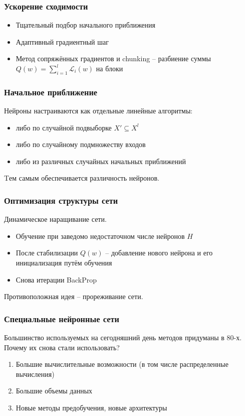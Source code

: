 \documentclass[10pt]{beamer}
\begin{document}
\begin{frame}\frametitle{Ускорение сходимости}
	\begin{itemize}[<+->]
		\item Тщательный подбор начального приближения
		\item Адаптивный градиентный шаг
		\item Метод сопряжённых градиентов и chunking -- разбиение суммы $Q(w) = \sum\limits_{i=1}^l \mathcal{L}_i(w)$ на блоки
	\end{itemize}
\end{frame}

\begin{frame}\frametitle{Начальное приближение}
	Нейроны настраиваются как отдельные линейные алгоритмы:
	\begin{itemize}
		\item либо по случайной подвыборке $X' \subseteq X^l$
		\item либо по случайному подмножеству входов
		\item либо из различных случайных начальных приближений
	\end{itemize}
	Tем самым обеспечивается различность нейронов.
\end{frame}

\begin{frame}\frametitle{Оптимизация структуры сети}
	Динамическое наращивание сети.\\
	\begin{itemize}[<+->]
		\item Обучение при заведомо недостаточном числе нейронов $H$
		\item После стабилизации  $Q(w)$ -- добавление нового нейрона и его инициализация путём обучения
		\item Снова итерации BackProp
	\end{itemize}
	\vspace{5mm}
	Противоположная идея -- прореживание сети.
\end{frame}

\begin{frame}\frametitle{Специальные нейронные сети}
	Большинство используемых на сегодняшний день методов придуманы в 80-х.\\
	Почему их снова стали использовать?\\
	\begin{enumerate}[--]
		\item Большие вычислительные возможности (в том числе
		распределенные вычисления)
		\item Большие объемы данных
		\item Новые методы предобучения, новые архитектуры
	\end{enumerate}
\end{frame}
\end{document}
